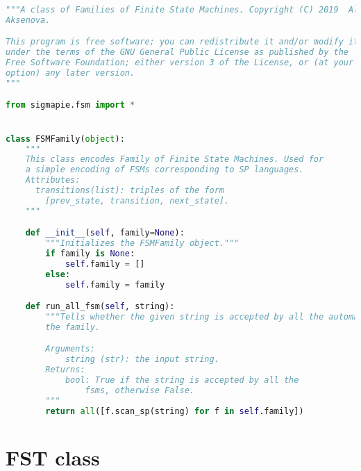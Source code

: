 \begin{lstlisting}[language=Python]
"""A class of Families of Finite State Machines. Copyright (C) 2019  Alena
Aksenova.

This program is free software; you can redistribute it and/or modify it
under the terms of the GNU General Public License as published by the
Free Software Foundation; either version 3 of the License, or (at your
option) any later version.
"""

from sigmapie.fsm import *


class FSMFamily(object):
    """
    This class encodes Family of Finite State Machines. Used for 
    a simple encoding of FSMs corresponding to SP languages.
    Attributes:
      transitions(list): triples of the form 
        [prev_state, transition, next_state].
    """

    def __init__(self, family=None):
        """Initializes the FSMFamily object."""
        if family is None:
            self.family = []
        else:
            self.family = family

    def run_all_fsm(self, string):
        """Tells whether the given string is accepted by all the automata of
        the family.

        Arguments:
            string (str): the input string.
        Returns:
            bool: True if the string is accepted by all the
                fsms, otherwise False.
        """
        return all([f.scan_sp(string) for f in self.family])
\end{lstlisting}

\section{FST class}

